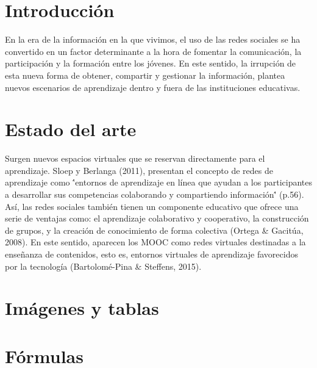 \documentclass[12pt]{article}
\begin{document}
\maketitle

\begin{abstract}
Este trabajo tiene como objeto de estudio comprender la influencia de las interacciones entre los escenarios escolares y virtuales en los procesos de aprendizaje. As\'i pues, se ha llevado a cabo un estudio de caso de un alumno de ESO (Educaci\'on Secundaria Obligatoria) de 15 años de edad. Como herramientas de recogida de informaci\'on hemos utilizado las entrevistas en profundidad. Los resultados muestran el gran potencial que tienen las redes sociales para desarrollar el aprendizaje, la identidad y el capital social en los adolescentes.\\\\
Enlace al repositorio: \url{https://github.com/jmiguel22/proyecto_final.git}\\\\
\textbf{Palabras clave:} Aprendizaje, Redes sociales

\end{abstract}

\section{Introducci\'on}
En la era de la informaci\'on en la que vivimos, el uso de las redes sociales se ha convertido en un factor determinante a la hora de fomentar la comunicaci\'on, la participaci\'on y la formaci\'on entre los j\'ovenes. En este sentido, la irrupci\'on de esta nueva forma de obtener, compartir y gestionar la informaci\'on, plantea nuevos escenarios de aprendizaje dentro y fuera de las instituciones educativas. 

\section{Estado del arte}
Surgen nuevos espacios virtuales que se reservan directamente para el aprendizaje. Sloep y Berlanga (2011), presentan el concepto de redes de aprendizaje como \''entornos de aprendizaje en l\'inea que ayudan a los participantes a desarrollar sus competencias colaborando y compartiendo informaci\'on\'' (p.56). As\'i, las redes sociales tambi\'en tienen un componente educativo que ofrece una serie de ventajas como: el aprendizaje colaborativo y cooperativo, la construcci\'on de grupos, y la creaci\'on de conocimiento de forma colectiva (Ortega & Gacitúa, 2008). En este sentido, aparecen los MOOC como redes virtuales destinadas a la enseñanza de contenidos, esto es, entornos virtuales de aprendizaje favorecidos por la tecnolog\'ia (Bartolomé-Pina & Steffens, 2015).

\section{Im\'agenes y tablas}

\section{F\'ormulas}



\end{document}
